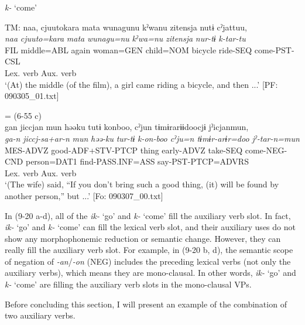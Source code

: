 \exi{} \textit{k-} ‘come’

\ex %
\gllll  TM:  naa,  cjuutokara  mata  wunagunu  kˀwanu  {\textbar}zitensja{\textbar} nutɨ  cˀjattuu,\\
      \textit{naa}  \textit{cjuuto=kara}  \textit{mata}  \textit{wunagu=nu}  \textit{kˀwa=nu}  \textit{zitensja}  \textit{nur-tɨ}  \textit{k{}-tar-tu}\\
      FIL  middle=ABL  again  woman=GEN  child=NOM  bicycle    ride-SEQ  come-PST-CSL\\
                                                             Lex. verb  Aux. verb\\
      \glt       ‘(At) the middle (of the film), a girl came riding a bicycle, and then ...’ [PF: 090305\_01.txt]

\ex{} = (6-55 c)\\
    \gllll gan  jiccjan  mun  həəku  tutɨ  konboo,  cˀjun  tɨmɨrarɨɨdoocjɨ  jˀicjanmun,\\
      \textit{ga-n}  \textit{jiccj-sa+ar-n}  \textit{mun}  \textit{həə-ku}  \textit{tur-tɨ} \textit{k{}-on-boo  cˀju=n  tɨmɨr-arɨr=doo  jˀ-tar-n=mun}\\
      MES-ADVZ  good-ADF+STV-PTCP  thing  early-ADVZ  take-SEQ  come-NEG-CND  person=DAT1  find-PASS.INF=ASS  say-PST-PTCP=ADVRS\\
              Lex. verb                                          Aux. verb \\              
      \glt ‘(The wife) said, “If you don’t bring such a good thing, (it) will be found by another person,” but ...’   [Fo: 090307\_00.txt]
    \z
\z

In (9-20 a-d), all of the \textit{ik-} ‘go’ and \textit{k-} ‘come’ fill the auxiliary verb slot. In fact, \textit{ik-} ‘go’ and \textit{k-} ‘come’ can fill the lexical verb slot, and their auxiliary uses do not show any morphophonemic reduction or semantic change. However, they can really fill the auxiliary verb slot. For example, in (9-20 b, d), the semantic scope of negation of \textit{{}-an}/\textit{{}-on} (NEG) includes the preceding lexical verbs (not only the auxiliary verbs), which means they are mono-clausal. In other words, \textit{ik-} ‘go’ and \textit{k-} ‘come’ are filling the auxiliary verb slots in the mono-clausal VPs.

Before concluding this section, I will present an example of the combination of two auxiliary verbs.

